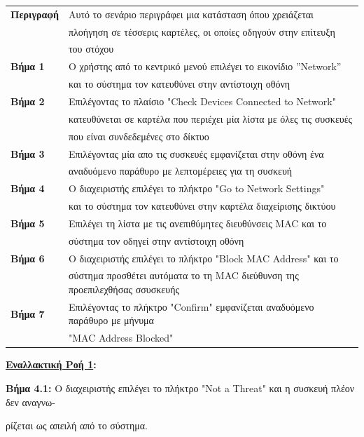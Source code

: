 \documentclass{article}
\newcommand\T{\rule{0pt}{2.6ex}}       %
\newcommand\B{\rule[-1.2ex]{0pt}{0pt}}
\begin{document}
 \begin{center}
     \begin{tabular}{|l|l|}
     \hline
      \textbf{Περιγραφή} & Αυτό το σενάριο περιγράφει μια κατάσταση όπου χρειάζεται \T \\& πλοήγηση σε τέσσερις καρτέλες, οι οποίες οδηγούν στην επίτευξη \\& του στόχου \B \\ 
      \hline
      \textbf{Βήμα 1} & Ο χρήστης από το κεντρικό μενού επιλέγει το εικονίδιο ”Network” \T \\& και το σύστημα τον κατευθύνει στην αντίστοιχη οθόνη \B \\
      \hline
      \textbf{Βήμα 2} & Επιλέγοντας το πλαίσιο "Check Devices Connected to Network"\T \\& κατευθύνεται σε καρτέλα που περιέχει μία λίστα με όλες τις συσκευές \\& που είναι συνδεδεμένες στο δίκτυο \B \\
      \hline
      \textbf{Βήμα 3} & Επιλέγοντας μία απο τις συσκευές εμφανίζεται στην οθόνη ένα \T \\& αναδυόμενο παράθυρο  με λεπτομέρειες για τη συσκευή \B \\
      \hline
      \textbf{Βήμα 4} & Ο διαχειριστής επιλέγει το πλήκτρο "Go to Network Settings" \T \\& και το σύστημα τον κατευθύνει στην καρτέλα διαχείρισης δικτύου \B \\
      \hline
      \textbf{Βήμα 5} & Επιλέγει τη λίστα με τις ανεπιθύμητες διευθύνσεις MAC και το \T \\& σύστημα τον οδηγεί στην αντίστοιχη οθόνη \B \\
      \hline
      \textbf{Βήμα 6} & Ο διαχειριστής επιλέγει το πλήκτρο "Block MAC Address" και το \T \\& σύστημα προσθέτει αυτόματα το τη MAC διεύθυνση της προεπιλεχθήσας σσυσκευής\B \\
      \hline
      \textbf{Βήμα 7} & Επιλέγοντας το πλήκτρο "Confirm" εμφανίζεται αναδυόμενο παράθυρο με μήνυμα \T \\& "MAC Address Blocked" \B \\
      \hline
     \end{tabular}
 \end{center}
 
\vspace{0.2cm}
 
\textbf{\underline{Εναλλακτική Ροή 1}:} \newline
\par \textbf{Βήμα 4.1:} Ο διαχειριστής επιλέγει το πλήκτρο "Not a Threat" και  η συσκευή πλέον δεν αναγνω- \par ρίζεται ως απειλή από το σύστημα.  
\end{document}
